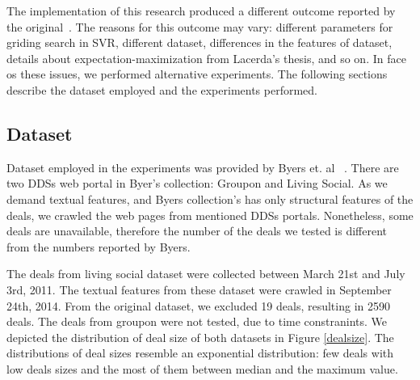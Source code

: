 \documentclass{acm_proc_article-sp}
\begin{document}
The implementation of this research produced a different outcome reported  
by the original~\cite{lacerda2014context}. The reasons for this outcome 
may vary: different parameters for griding search in SVR, different dataset, 
differences in the features of dataset, 
details about expectation-maximization from Lacerda's thesis, and so on.
In face os these issues, we performed alternative experiments. The following 
sections describe the dataset employed and the experiments performed.


\subsection{Dataset}

Dataset employed in the experiments was provided by Byers et. al ~\cite{BMZ12}.
There are two DDSs web portal in Byer's collection: Groupon and Living Social. 
As we demand textual features, and Byers collection's has only structural 
features of the deals, we crawled the web pages from mentioned DDSs portals. 
Nonetheless, some deals are unavailable, therefore the number of the deals 
we tested is different from the numbers reported by Byers.


The deals from living social dataset were collected between March 21st and 
July 3rd, 2011. The textual features from these dataset were crawled in 
September 24th, 2014. From the original dataset, we excluded 19 deals, 
resulting in 2590 deals. The deals from groupon were not tested, due to 
time constranints. We depicted the distribution of deal size of 
both datasets in Figure \ref{dealsize}. The distributions of deal 
sizes resemble an exponential distribution: few deals with low deals sizes 
and the most of them between median and the maximum value.
\end{document}
